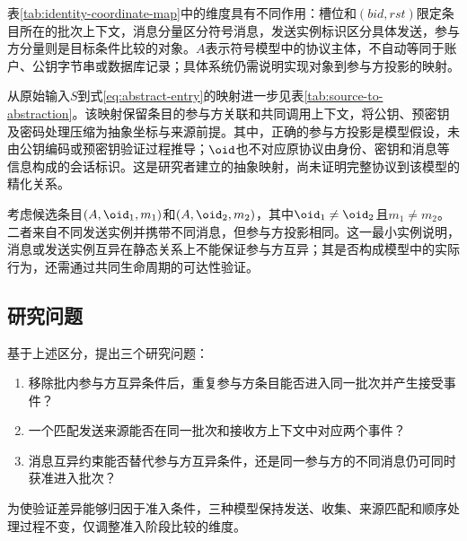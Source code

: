 

表\ref{tab:identity-coordinate-map}中的维度具有不同作用：槽位和$(\mathit{bid},\mathit{rst})$限定条目所在的批次上下文，消息分量区分符号消息，发送实例标识区分具体发送，参与方分量则是目标条件比较的对象。$A$表示符号模型中的协议主体，不自动等同于账户、公钥字节串或数据库记录；具体系统仍需说明实现对象到参与方投影的映射。

从原始输入$S$到式\eqref{eq:abstract-entry}的映射进一步见表\ref{tab:source-to-abstraction}。该映射保留条目的参与方关联和共同调用上下文，将公钥、预密钥及密码处理压缩为抽象坐标与来源前提。其中，正确的参与方投影是模型假设，未由公钥编码或预密钥验证过程推导；$\oid$也不对应原协议由身份、密钥和消息等信息构成的会话标识。这是研究者建立的抽象映射，尚未证明完整协议到该模型的精化关系。



考虑候选条目$(A,\oid_1,m_1)$和$(A,\oid_2,m_2)$，其中$\oid_1\neq\oid_2$且$m_1\neq m_2$。二者来自不同发送实例并携带不同消息，但参与方投影相同。这一最小实例说明，消息或发送实例互异在静态关系上不能保证参与方互异；其是否构成模型中的实际行为，还需通过共同生命周期的可达性验证。

\subsection{研究问题}
\label{subsec:research-questions}

基于上述区分，提出三个研究问题：
\begin{enumerate}[label=\textbf{RQ\arabic*：},leftmargin=4.2em,labelsep=0.5em]
  \item 移除批内参与方互异条件后，重复参与方条目能否进入同一批次并产生接受事件？
  \item 一个匹配发送来源能否在同一批次和接收方上下文中对应两个\receiveraccept 事件？
  \item 消息互异约束能否替代参与方互异条件，还是同一参与方的不同消息仍可同时获准进入批次？
\end{enumerate}

为使验证差异能够归因于准入条件，三种模型保持发送、收集、来源匹配和顺序处理过程不变，仅调整准入阶段比较的维度。

